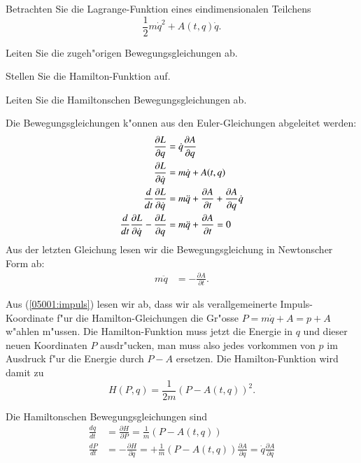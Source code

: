 Betrachten Sie die Lagrange-Funktion eines eindimensionalen Teilchens
\[
\frac12m\dot q^2 + A(t,q)\dot q.
\]
\begin{teilaufgaben}
\item
Leiten Sie die zugeh"origen Bewegungsgleichungen ab.
\item
Stellen Sie die Hamilton-Funktion auf.
\item
Leiten Sie die Hamiltonschen Bewegungsgleichungen ab.
\end{teilaufgaben}


\begin{loesung}
\begin{teilaufgaben}
\item
Die Bewegungsgleichungen k"onnen aus den Euler-Gleichungen abgeleitet
werden:
\begin{align}
\frac{\partial L}{\partial q}&=\dot q \frac{\partial A}{\partial q}
\notag
\\
\frac{\partial L}{\partial \dot q}&=m\dot q+ A(t,q)
\label{05001:impuls}
\\
\frac{d}{dt}\frac{\partial L}{\partial\dot q}
&=
m\ddot q+\frac{\partial A}{\partial t}+\frac{\partial A}{\partial q}\dot q
\label{05001:derivative}
\\
\frac{d}{dt}\frac{\partial L}{\partial\dot q}-\frac{\partial L}{\partial q}
&=
m\ddot q+\frac{\partial A}{\partial t}
=0
\notag
\end{align}
Aus der letzten Gleichung lesen wir die Bewegungsgleichung in Newtonscher
Form ab:
\begin{align*}
m\ddot q&=-\frac{\partial A}{\partial t}.
\end{align*}
\item
Aus (\ref{05001:impuls}) lesen wir ab, dass wir als verallgemeinerte
Impuls-Koordinate f"ur die Hamilton-Gleichungen die Gr"osse
$P=m\dot q+A=p+A$ w"ahlen m"ussen.
Die Hamilton-Funktion muss jetzt die Energie in $q$ und dieser neuen
Koordinaten $P$ ausdr"ucken, man muss also jedes vorkommen von $p$
im Ausdruck f"ur die Energie durch $P-A$ ersetzen.
Die Hamilton-Funktion wird damit zu
\[
H(P,q)=\frac1{2m}(P-A(t,q))^2.
\]
\item
Die Hamiltonschen Bewegungsgleichungen sind
\begin{align*}
\frac{dq}{dt}
&=
\frac{\partial H}{\partial P}
=
\frac1m(P-A(t,q))
\\
\frac{dP}{dt}
&=
-\frac{\partial H}{\partial q}
=
+\frac1m(P-A(t,q))\frac{\partial A}{\partial q}
=
\dot q\frac{\partial A}{\partial q}
\end{align*}

\end{teilaufgaben}
\end{loesung}
